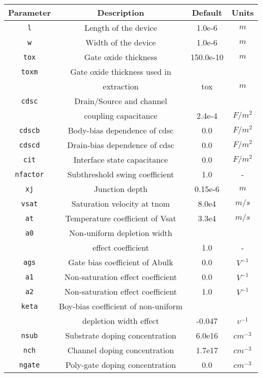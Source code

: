 \documentclass{article}
\begin{document}
\begin{table}[H]
\begin{tabular}{|c| c| c| c|}
\hline
\textbf{Parameter} & \textbf{Description} & \textbf{Default} & \textbf{Units} \\
\hline
\texttt{l} & Length of the device & 1.0e-6 & $m$\\
\texttt{w} & Width of the device & 1.0e-6 & $m$\\
\texttt{tox} & Gate oxide thickness & 150.0e-10 & $m$ \\
\texttt{toxm} & Gate oxide thickness used in & &\\
              & extraction & tox & $m$\\
\texttt{cdsc} & Drain/Source and channel & &\\
              & coupling capacitance & 2.4e-4 & $F/m^2$ \\
\texttt{cdscb} & Body-bias dependence of cdsc & 0.0 & $F/m^2$\\
\texttt{cdscd} & Drain-bias dependence of cdsc & 0.0 & $F/m^2$\\
\texttt{cit} & Interface state capacitance & 0.0 & $F/m^2$\\
\texttt{nfactor} & Subthreshold swing coefficient & 1.0 & -\\
\texttt{xj} & Junction depth & 0.15e-6 & $m$\\
\texttt{vsat} & Saturation velocity at tnom & 8.0e4 & $m/s$\\
\texttt{at} & Temperature coefficient of Vsat & 3.3e4 & $m/s$\\
\texttt{a0} & Non-uniform depletion width & & \\
             & effect coefficient & 1.0 & -\\
\texttt{ags} & Gate bias coefficient of Abulk & 0.0 & $V^{-1}$\\
\texttt{a1} & Non-saturation effect coefficient & 0.0 & $V^{-1}$\\
\texttt{a2} & Non-saturation effect coefficient & 1.0 & $V^{-1}$\\
\texttt{keta} & Boy-bias coefficient of non-uniform & & \\
              & depletion width effect & -0.047 & $v^{-1}$\\
\texttt{nsub} & Substrate doping concentration & 6.0e16 & $cm^{-3}$\\
\texttt{nch} & Channel doping concentration & 1.7e17 & $cm^{-3}$\\
\texttt{ngate} & Poly-gate doping concentration & 0.0 & $cm^{-3}$\\

\end{tabular}
\end{table}
\end{document}
